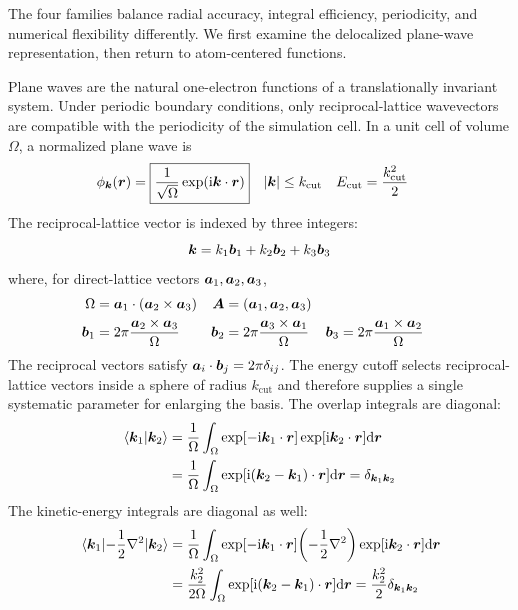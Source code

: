The four families balance radial accuracy, integral efficiency, periodicity,
and numerical flexibility differently. We first examine the delocalized
plane-wave representation, then return to atom-centered functions.

Plane waves are the natural one-electron functions of a translationally
invariant system. Under periodic boundary conditions, only reciprocal-lattice
wavevectors are compatible with the periodicity of the simulation cell.
In a unit cell of volume $\Omega$, a normalized plane wave is
\begin{align}
  \phi_{\boldsymbol{k}}(\boldsymbol{r})&=\boxed{\frac{1}{\sqrt{\Omega}}\exp(\mathrm{i}\boldsymbol{k}\cdot\boldsymbol{r})}
  &
  \abs{\boldsymbol{k}}&\leq k_\text{cut}
  &
  E_\text{cut}&=\frac{k_\text{cut}^2}{2}
\end{align}
The reciprocal-lattice vector is indexed by three integers:
\begin{equation}
  \boldsymbol{k}=k_1\boldsymbol{b}_1+k_2\boldsymbol{b}_2+k_3\boldsymbol{b}_3
\end{equation}
where, for direct-lattice vectors $\boldsymbol{a}_1,\boldsymbol{a}_2,\boldsymbol{a}_3$,
\begin{align}
  \Omega&=\boldsymbol{a}_1\cdot(\boldsymbol{a}_2\times\boldsymbol{a}_3)
  &\boldsymbol{A}&=(\boldsymbol{a}_1,\boldsymbol{a}_2,\boldsymbol{a}_3)\\
  \boldsymbol{b}_1&=2\pi\frac{\boldsymbol{a}_2\times\boldsymbol{a}_3}{\Omega}
  &\boldsymbol{b}_2&=2\pi\frac{\boldsymbol{a}_3\times\boldsymbol{a}_1}{\Omega}
  &\boldsymbol{b}_3&=2\pi\frac{\boldsymbol{a}_1\times\boldsymbol{a}_2}{\Omega}
\end{align}
The reciprocal vectors satisfy $\boldsymbol{a}_i\cdot\boldsymbol{b}_j=2\pi\delta_{ij}$. The energy
cutoff selects reciprocal-lattice vectors inside a sphere of radius
$k_\text{cut}$ and therefore supplies a single systematic parameter for
enlarging the basis.
The overlap integrals are diagonal:
\begin{equation}
\begin{split}
  \braket{\boldsymbol{k}_1}{\boldsymbol{k}_2}
  &=\frac{1}{\Omega}\int_\Omega
    \exp[-\mathrm{i}\boldsymbol{k}_1\cdot\boldsymbol{r}]\exp[\mathrm{i}\boldsymbol{k}_2\cdot\boldsymbol{r}]\dd\boldsymbol{r}\\
  &=\frac{1}{\Omega}\int_\Omega
    \exp[\mathrm{i}(\boldsymbol{k}_2-\boldsymbol{k}_1)\cdot\boldsymbol{r}]\dd\boldsymbol{r}
  =\delta_{\boldsymbol{k}_1\boldsymbol{k}_2}
\end{split}
\end{equation}
The kinetic-energy integrals are diagonal as well:
\begin{equation}
\begin{split}
  \mel{\bk_1}{-\frac12\laplacian}{\bk_2}
  &=\frac{1}{\Omega}\int_\Omega
    \exp[-\ii\bk_1\cdot\br]
    \qty(-\frac12\laplacian)\exp[\ii\bk_2\cdot\br]\dd\br\\
  &=\frac{k_2^2}{2\Omega}\int_\Omega
    \exp[\ii(\bk_2-\bk_1)\cdot\br]\dd\br
  =\frac{k_2^2}{2}\delta_{\bk_1\bk_2}
\end{split}
\end{equation}

